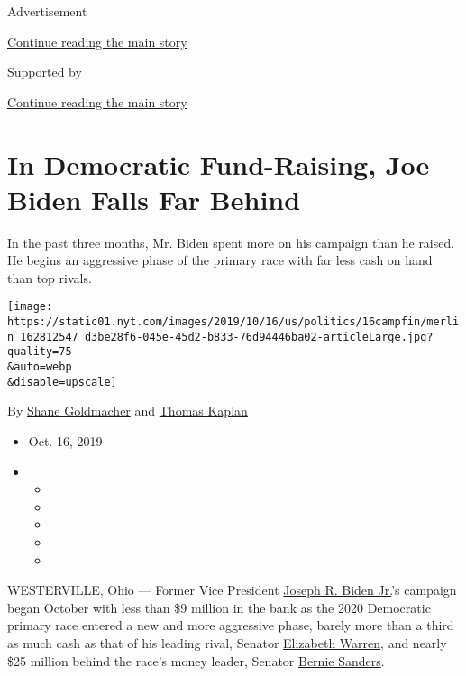 Advertisement

\protect\hyperlink{after-top}{Continue reading the main story}

Supported by

\protect\hyperlink{after-sponsor}{Continue reading the main story}

\hypertarget{in-democratic-fund-raising-joe-biden-falls-far-behind}{%
\section{In Democratic Fund-Raising, Joe Biden Falls Far
Behind}\label{in-democratic-fund-raising-joe-biden-falls-far-behind}}

In the past three months, Mr. Biden spent more on his campaign than he
raised. He begins an aggressive phase of the primary race with far less
cash on hand than top rivals.

\texttt{[image: https://static01.nyt.com/images/2019/10/16/us/politics/16campfin/merlin\_162812547\_d3be28f6-045e-45d2-b833-76d94446ba02-articleLarge.jpg?quality=75\\\&auto=webp\\\&disable=upscale]}

By \href{https://www.nytimes.com/by/shane-goldmacher}{Shane Goldmacher}
and \href{https://www.nytimes.com/by/thomas-kaplan}{Thomas Kaplan}

\begin{itemize}
\item
  Oct. 16, 2019
\item
  \begin{itemize}
  \item
  \item
  \item
  \item
  \item
  \end{itemize}
\end{itemize}

WESTERVILLE, Ohio --- Former Vice President
\href{https://www.nytimes.com/interactive/2020/us/elections/joe-biden.html}{Joseph
R. Biden Jr.}'s campaign began October with less than \$9 million in the
bank as the 2020 Democratic primary race entered a new and more
aggressive phase, barely more than a third as much cash as that of his
leading rival, Senator
\href{https://www.nytimes.com/interactive/2020/us/elections/elizabeth-warren.html}{Elizabeth
Warren}, and nearly \$25 million behind the race's money leader, Senator
\href{https://www.nytimes.com/interactive/2020/us/elections/bernie-sanders.html}{Bernie
Sanders}.

